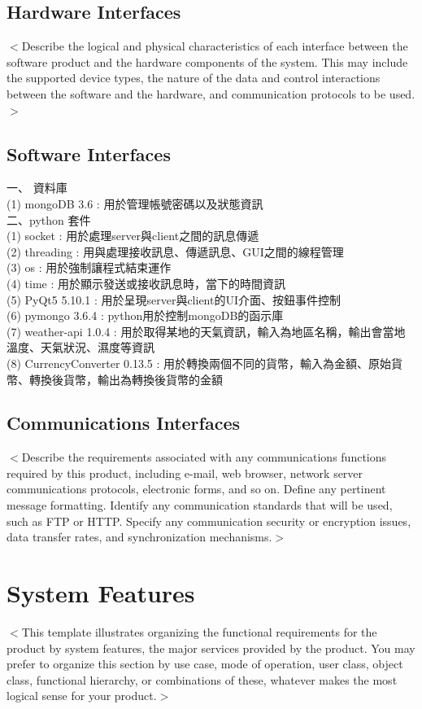 \documentclass{scrreprt}
\begin{document}
\begin{CJK}{UTF8}{bkai}
\section{Hardware Interfaces}
$<$Describe the logical and physical characteristics of each interface between 
the software product and the hardware components of the system. This may include 
the supported device types, the nature of the data and control interactions 
between the software and the hardware, and communication protocols to be 
used.$>$

\section{Software Interfaces}
一、 資料庫 \\
(1) mongoDB 3.6 : 用於管理帳號密碼以及狀態資訊 \\
二、python 套件 \\
(1) socket : 用於處理server與client之間的訊息傳遞 \\
(2) threading : 用與處理接收訊息、傳遞訊息、GUI之間的線程管理 \\
(3) os : 用於強制讓程式結束運作\\
(4) time : 用於顯示發送或接收訊息時，當下的時間資訊\\
(5) PyQt5 5.10.1 : 用於呈現server與client的UI介面、按鈕事件控制\\
(6) pymongo 3.6.4 : python用於控制mongoDB的函示庫\\
(7) weather-api 1.0.4 : 用於取得某地的天氣資訊，輸入為地區名稱，輸出會當地溫度、天氣狀況、濕度等資訊\\
(8) CurrencyConverter 0.13.5 : 用於轉換兩個不同的貨幣，輸入為金額、原始貨幣、轉換後貨幣，輸出為轉換後貨幣的金額 \\

\section{Communications Interfaces}
$<$Describe the requirements associated with any communications functions 
required by this product, including e-mail, web browser, network server 
communications protocols, electronic forms, and so on. Define any pertinent 
message formatting. Identify any communication standards that will be used, such 
as FTP or HTTP. Specify any communication security or encryption issues, data 
transfer rates, and synchronization mechanisms.$>$


\chapter{System Features}
$<$This template illustrates organizing the functional requirements for the 
product by system features, the major services provided by the product. You may 
prefer to organize this section by use case, mode of operation, user class, 
object class, functional hierarchy, or combinations of these, whatever makes the 
most logical sense for your product.$>$


\end{CJK}
\end{document}
